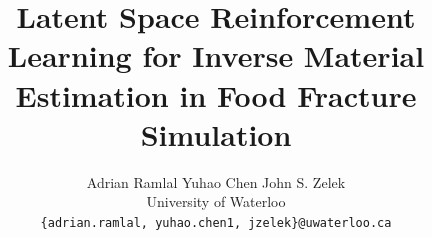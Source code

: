 \documentclass[10pt,twocolumn,letterpaper]{article}
\title{Latent Space Reinforcement Learning for Inverse Material Estimation in Food Fracture Simulation}
\author{Adrian Ramlal \quad
Yuhao Chen \quad
John S. Zelek\\
University of Waterloo\\
{\tt\small \{adrian.ramlal, yuhao.chen1, jzelek\}@uwaterloo.ca}
}
\begin{document}
\twocolumn[{
\maketitle

}]

    







{
    \small
    
    
}

% 
\end{document}
